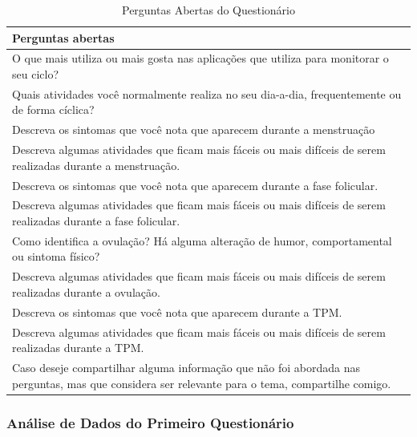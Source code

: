 \begin{table}[htbp]
    \centering
    \caption{Perguntas Abertas do Questionário}
    \label{tab08}
    \begin{tabular}{p{15cm}}
        \toprule
        \textbf{Perguntas abertas} \\
        \midrule     
        O que mais utiliza ou mais gosta nas aplicações que utiliza para monitorar o seu ciclo? \\
        \midrule
         Quais atividades você normalmente realiza no seu dia-a-dia, frequentemente ou de forma cíclica? \\
        \midrule
         Descreva os sintomas que você nota que aparecem durante a menstruação\\
        \midrule
         Descreva algumas atividades que ficam mais fáceis ou mais difíceis de serem realizadas durante a menstruação.\\
        \midrule
         Descreva os sintomas que você nota que aparecem durante a fase folicular.\\
        \midrule
         Descreva algumas atividades que ficam mais fáceis ou mais difíceis de serem realizadas durante a fase folicular.\\
        \midrule
         Como identifica a ovulação? Há alguma alteração de humor, comportamental ou sintoma físico? \\
        \midrule
         Descreva algumas atividades que ficam mais fáceis ou mais difíceis de serem realizadas durante a ovulação.\\
        \midrule
         Descreva os sintomas que você nota que aparecem durante a TPM.\\
        \midrule
         Descreva algumas atividades que ficam mais fáceis ou mais difíceis de serem realizadas durante a TPM.\\
        \midrule
         Caso deseje compartilhar alguma informação que não foi abordada nas perguntas, mas que considera ser relevante para o tema, compartilhe comigo. \\

        \bottomrule
    \end{tabular} 
\end{table}


\subsubsection{Análise de Dados do Primeiro Questionário}
\label{vsf1}

